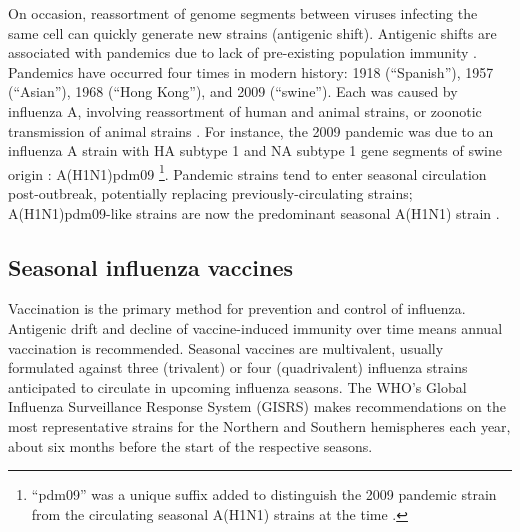 On occasion, reassortment of genome segments between viruses infecting the same cell can quickly generate new strains (antigenic shift).
Antigenic shifts are associated with pandemics due to lack of pre-existing population immunity \autocite{krammer2018Influenza}.
Pandemics have occurred four times in modern history: 1918 (\enquote{Spanish}), 1957 (\enquote{Asian}), 1968 (\enquote{Hong Kong}), and 2009 (\enquote{swine}).
Each was caused by influenza A, involving reassortment of human and animal strains, or zoonotic transmission of animal strains \autocite{short2018BackFutureLessons}.
%
For instance, the 2009 pandemic was due to an influenza A strain with \gls{HA} subtype 1 and \gls{NA} subtype 1 gene segments of swine origin \autocite{garten2009AntigenicGeneticCharacteristics}: A(H1N1)pdm09%
\footnote{
    \enquote{pdm09} was a unique suffix added to distinguish the 2009 pandemic strain from the circulating seasonal A(H1N1) strains at the time \autocite{worldhealthorganization2011StandardizationTerminologyPandemic}.
}.
Pandemic strains tend to enter seasonal circulation post-outbreak, potentially replacing previously-circulating strains;
A(H1N1)pdm09-like strains are now the predominant seasonal A(H1N1) strain \autocite{krammer2018Influenza}.
%

\subsection{Seasonal influenza vaccines}

Vaccination is the primary method for prevention and control of influenza.
Antigenic drift and decline of vaccine-induced immunity over time means annual vaccination is recommended.
Seasonal vaccines are multivalent, usually formulated against three (trivalent) or four (quadrivalent) influenza strains anticipated to circulate in upcoming influenza seasons.
The \gls{WHO}'s Global Influenza Surveillance Response System (GISRS) makes recommendations on the most representative strains for the Northern and Southern hemispheres each year, about six months before the start of the respective seasons.

